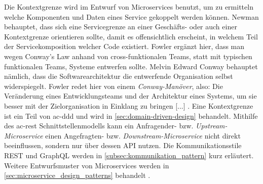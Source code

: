     Die Kontextgrenze wird im Entwurf von Microservices benutzt, um zu ermitteln welche Komponenten und Daten eines Service gekoppelt werden können. Newman behauptet, dass sich eine Servicegrenze an einer Geschäfts- oder auch einer Kontextgrenze orientieren sollte, damit es offensichtlich erscheint, in welchem Teil der Servicekomposition welcher Code existiert. Fowler ergänzt hier, dass man wegen Conway's Law anhand von cross-funktionalen Teams, statt mit typischen funktionalen Teams, Systeme entwerfen sollte. Melvin Edward Conway behauptet nämlich, dass die Softwarearchitektur die entwerfende Organisation selbst widerspiegelt. Fowler redet hier von einem \emph{Conway-Manöver}, also: \glqq Die Veränderung eines Entwicklungsteams und der Architektur eines Systems, um sie besser mit der Zielorganisation in Einklang zu bringen [...]\grqq{} \parencite[S. 114]{takai2017architektur}. Eine Kontextgrenze ist ein Teil von \gls{ac-ddd} und wird in \autoref{sec:domain-driven-design} behandelt. Mithilfe des \gls{ac-rest} Schnittstellenmodells kann ein Anfragender- bzw. \emph{Upstream-Microservice} einen Angefragten- bzw. \emph{Downstream-Microservice} nicht direkt beeinflussen, sondern nur über dessen API nutzen. Die Kommunikationsstile REST und GraphQL werden in \autoref{subsec:kommunikation_pattern} kurz erläutert. Weitere Entwurfsmuster von Microservices werden in \autoref{sec:microservice_design_patterns} behandelt \parencites[S. 18--20]{takai2017architektur}[S. 31]{conway1968committees}{newman2015buildingmicroservices}{fowlerlewis2014microservices}.

